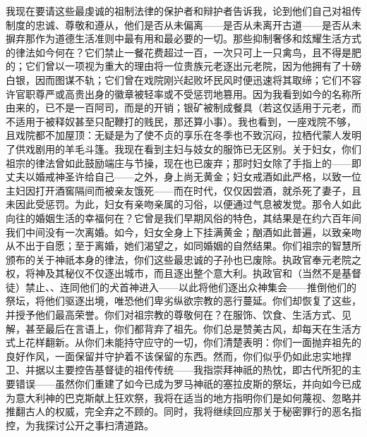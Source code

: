 我现在要请这些最虔诚的祖制法律的保护者和辩护者告诉我，论到他们自己对祖传制度的忠诚、尊敬和遵从，他们是否从未偏离——是否从未离开古道——是否从未摒弃那作为道德生活准则中最有用和最必要的一切。那些抑制奢侈和炫耀生活方式的律法如今何在？它们禁止一餐花费超过一百，一次只可上一只禽鸟，且不得是肥的；它们曾以一项视为重大的理由将一位贵族元老逐出元老院，因为他拥有了十磅白银，因而图谋不轨；它们曾在戏院刚兴起败坏民风时便迅速将其取缔；它们不容许官职尊严或高贵出身的徽章被轻率或不受惩罚地篡用。因为我看到如今的名称所由来的，已不是一百阿司，而是的开销；银矿被制成餐具（若这仅适用于元老，而不适用于被释奴甚至只配鞭打的贱民，那还算小事）。我也看到，一座戏院不够，且戏院都不加屋顶：无疑是为了使不贞的享乐在冬季也不致沉闷，拉栖代蒙人发明了供戏剧用的羊毛斗篷。我现在看到主妇与妓女的服饰已无区别。关于妇女，你们祖宗的律法曾如此鼓励端庄与节操，现在也已废弃；那时妇女除了手指上的——即丈夫以婚戒神圣许给自己——之外，身上尚无黄金；妇女戒酒如此严格，以致一位主妇因打开酒窖隔间而被亲友饿死——而在时代，仅仅因尝酒，就杀死了妻子，且未因此受惩罚。为此，妇女有亲吻亲属的习俗，以便通过气息被发觉。那令人如此向往的婚姻生活的幸福何在？它曾是我们早期风俗的特色，其结果是在约六百年间我们中间没有一次离婚。如今，妇女全身上下挂满黄金；酗酒如此普遍，以致亲吻从不出于自愿；至于离婚，她们渴望之，如同婚姻的自然结果。你们祖宗的智慧所颁布的关于神祇本身的律法，你们这些最忠诚的子孙也已废除。执政官奉元老院之权，将神及其秘仪不仅逐出城市，而且逐出整个意大利。执政官和（当然不是基督徒）禁止、、连同他们的犬首神进入——以此将他们逐出众神集会——推倒他们的祭坛，将他们驱逐出境，唯恐他们卑劣纵欲宗教的恶行蔓延。你们却恢复了这些，并授予他们最高荣誉。你们对祖宗教的尊敬何在？在服饰、饮食、生活方式、见解，甚至最后在言语上，你们都背弃了祖先。你们总是赞美古风，却每天在生活方式上花样翻新。从你们未能持守应守的一切，你们清楚表明：你们一面抛弃祖先的良好作风，一面保留并守护着不该保留的东西。然而，你们似乎仍如此忠实地捍卫、并据以主要控告基督徒的祖传传统——我指崇拜神祇的热忱，即古代所犯的主要错误——虽然你们重建了如今已成为罗马神祇的塞拉皮斯的祭坛，并向如今已成为意大利神的巴克斯献上狂欢祭，我将在适当的地方指明你们是如何蔑视、忽略并推翻古人的权威，完全弃之不顾的。同时，我将继续回应那关于秘密罪行的恶名指控，为我探讨公开之事扫清道路。\par



